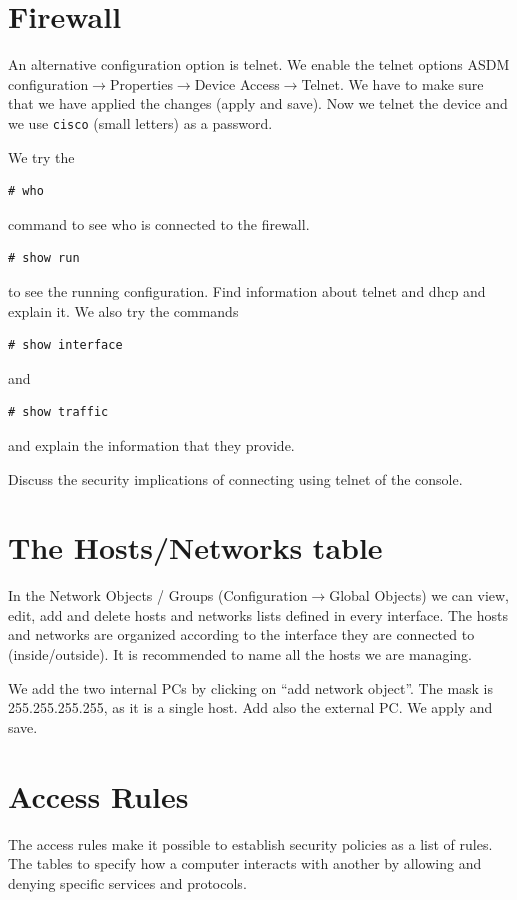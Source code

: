 \section{Firewall}
An alternative configuration option is telnet.
We enable the telnet options ASDM configuration$\rightarrow$Properties$\rightarrow$Device Access$\rightarrow$Telnet.
We have to make sure that we have applied the changes (apply and save).
Now we telnet the device and we use \texttt{cisco} (small letters) as a password.

We try the 
\begin{lstlisting}
# who
\end{lstlisting}
command to see who is connected to the firewall.
\begin{lstlisting}
# show run
\end{lstlisting}
to see the running configuration.
Find information about telnet and dhcp and explain it.
We also try the commands
\begin{lstlisting}
# show interface
\end{lstlisting}
and
\begin{lstlisting}
# show traffic
\end{lstlisting}
and explain the information that they provide.

Discuss the security implications of connecting using telnet of the console.

\section{The Hosts/Networks table}
In the Network Objects / Groups (Configuration$\rightarrow$Global Objects) we can view, edit, add and delete hosts and networks lists  defined in every interface.
The hosts and networks are organized according to the interface they are connected to (inside/outside).
It is recommended to name all the hosts we are managing.

We add the two internal PCs by clicking on ``add network object''. 
The mask is 255.255.255.255, as it is a single host.
Add also the external PC.
We apply and save.

\section{Access Rules}
The access rules make it possible to establish security policies as a list of rules.
The tables to specify how a computer interacts with another by allowing and denying specific services and protocols.

